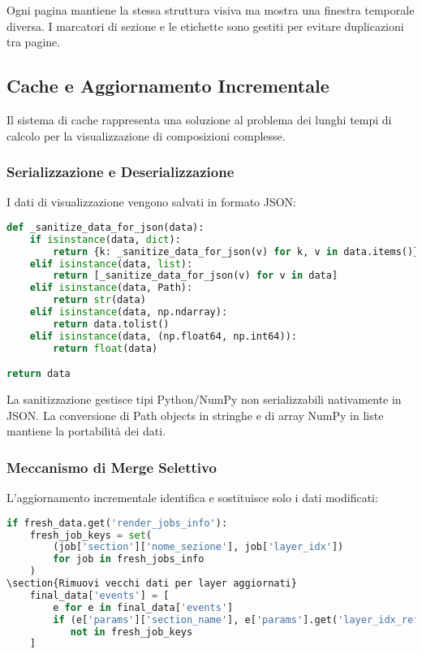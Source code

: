 Ogni pagina mantiene la stessa struttura visiva ma mostra una finestra temporale diversa. I marcatori di sezione e le etichette sono gestiti per evitare duplicazioni tra pagine.
\subsection{Cache e Aggiornamento Incrementale}
Il sistema di cache rappresenta una soluzione al problema dei lunghi tempi di calcolo per la visualizzazione di composizioni complesse.
\subsubsection{Serializzazione e Deserializzazione}
I dati di visualizzazione vengono salvati in formato JSON:

\begin{lstlisting}[language=Python]
def _sanitize_data_for_json(data):
    if isinstance(data, dict):
        return {k: _sanitize_data_for_json(v) for k, v in data.items()}
    elif isinstance(data, list):
        return [_sanitize_data_for_json(v) for v in data]
    elif isinstance(data, Path):
        return str(data)
    elif isinstance(data, np.ndarray):
        return data.tolist()
    elif isinstance(data, (np.float64, np.int64)):
        return float(data)

return data
\end{lstlisting}

La sanitizzazione gestisce tipi Python/NumPy non serializzabili nativamente in JSON. La conversione di Path objects in stringhe e di array NumPy in liste mantiene la portabilità dei dati.
\subsubsection{Meccanismo di Merge Selettivo}
L'aggiornamento incrementale identifica e sostituisce solo i dati modificati:

\begin{lstlisting}[language=Python]
if fresh_data.get('render_jobs_info'):
    fresh_job_keys = set(
        (job['section']['nome_sezione'], job['layer_idx']) 
        for job in fresh_jobs_info
    )
\section{Rimuovi vecchi dati per layer aggiornati}
    final_data['events'] = [
        e for e in final_data['events']
        if (e['params']['section_name'], e['params'].get('layer_idx_ref')) 
           not in fresh_job_keys
    ]
\end{lstlisting}

